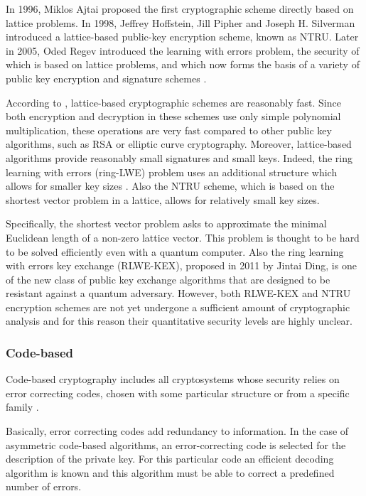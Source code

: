 \documentclass[a4paper,12pt]{article}
\begin{document}
In 1996, Miklos Ajtai proposed the first cryptographic scheme directly based on lattice problems. In 1998, Jeffrey Hoffstein, Jill Pipher and Joseph H. Silverman introduced a lattice-based public-key encryption scheme, known as NTRU. Later in 2005, Oded Regev introduced the learning with errors problem, the security of which is based on lattice problems, and which now forms the basis of a variety of public key encryption and signature schemes \cite{24_LWE}.

According to \cite{1_sphincspaper}, lattice-based cryptographic schemes are reasonably fast.
Since both encryption and decryption in these schemes use only simple polynomial multiplication, these operations are very fast compared to other public key algorithms, such as RSA or elliptic curve cryptography.
Moreover, lattice-based algorithms provide reasonably small signatures and small keys.
Indeed, the ring learning with errors (ring-LWE) problem uses an additional structure which allows for smaller key sizes \cite{10_postquantum_keyexchange}. Also the NTRU scheme, which is based on the shortest vector problem in a lattice, allows for relatively small key sizes.

Specifically, the shortest vector problem asks to approximate the minimal Euclidean length of a non-zero lattice vector. This problem is thought to be hard to be solved efficiently even with a quantum computer.
Also the ring learning with errors key exchange (RLWE-KEX), proposed in 2011 by Jintai Ding, is one of the new class of public key exchange algorithms that are designed to be resistant against a quantum adversary.
However, both RLWE-KEX and NTRU encryption schemes are not yet undergone a sufficient amount of cryptographic analysis and for this reason their quantitative security levels are highly unclear.


\subsubsection{Code-based}

Code-based cryptography includes all cryptosystems whose security relies on error correcting codes, chosen with some particular structure or from a specific family \cite{26_code_based}.

Basically, error correcting codes add redundancy to information. In the case of asymmetric code-based algorithms, an error-correcting code is selected for the description of the private key. For this particular code an efficient decoding algorithm is known and this algorithm must be able to correct a predefined number of errors.
\end{document}
